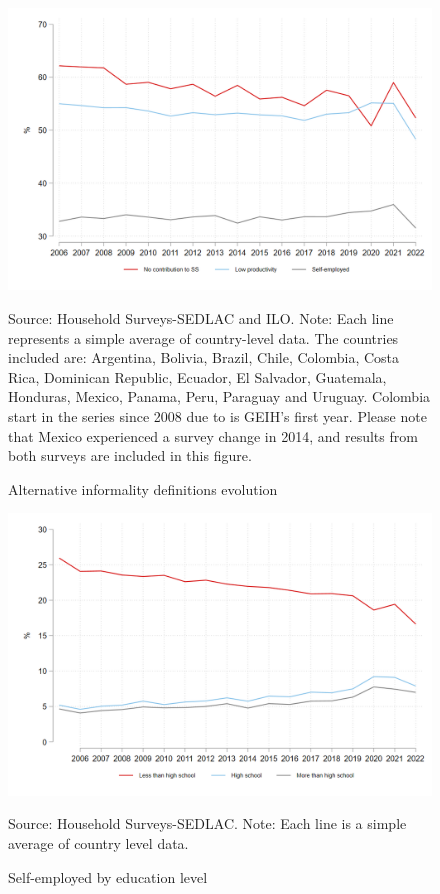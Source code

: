 \documentclass[english]{article}
\begin{document}
\begin{itemize}
              \begin{figure}[H]
                \justifying
                \caption{Alternative informality definitions evolution}  
                \centerline{\includegraphics[scale=.3]{latex/figures/Evolution/LAC_informalitydefs_v2.png}}
                \label{fig:info_defevolution}
                \footnotesize{Source: Household Surveys-SEDLAC and ILO.}
                \footnotesize{Note: Each line represents a simple average of country-level data. The countries included are: Argentina, Bolivia, Brazil, Chile, Colombia, Costa Rica, Dominican Republic, Ecuador, El Salvador, Guatemala, Honduras, Mexico, Panama, Peru, Paraguay and Uruguay. Colombia start in the series since 2008 due to is GEIH's first year. Please note that Mexico experienced a survey change in 2014, and results from both surveys are included in this figure.}
             \end{figure}

             \begin{figure}[H]
                \justifying
                \caption{Self-employed by education level}  
                \centerline{\includegraphics[scale=.3]{latex/figures/Evolution/LAC_selfemployment_educlevel.png}}
                \label{fig:se_evolution}
                \footnotesize{Source: Household Surveys-SEDLAC.}
                \footnotesize{Note: Each line is a simple average of country level data.}
             \end{figure}


\end{itemize}
\end{document}
